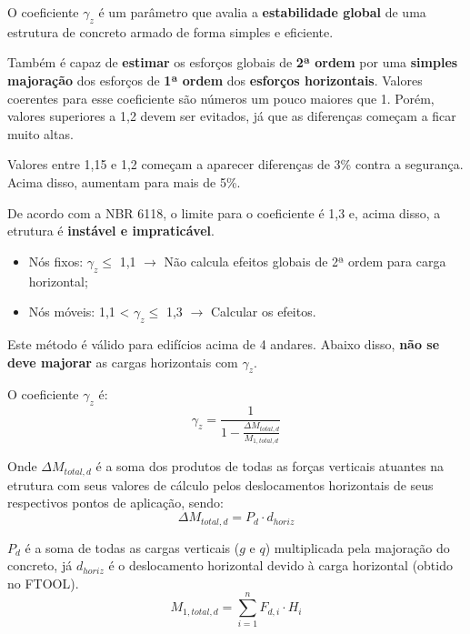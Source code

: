 O coeficiente $\gamma_z$ é um parâmetro que avalia a \textbf{estabilidade global} de uma estrutura de concreto armado de forma simples e eficiente.

Também é capaz de \textbf{estimar} os esforços globais de \textbf{2ª ordem} por uma \textbf{simples majoração} dos esforços de \textbf{1ª ordem} dos \textbf{esforços horizontais}. Valores coerentes para esse coeficiente são números um pouco maiores que 1. Porém, valores superiores a 1,2 devem ser evitados, já que as diferenças começam a ficar muito altas.

Valores entre 1,15 e 1,2 começam a aparecer diferenças de 3\% contra a segurança. Acima disso, aumentam para mais de 5\%.

De acordo com a NBR 6118, o limite para o coeficiente é 1,3 e, acima disso, a etrutura é \textbf{instável e impraticável}.

\begin{itemize}
	\item Nós fixos: $\gamma_z\leqslant$ 1,1 $\rightarrow$ Não calcula efeitos globais de 2ª ordem para carga horizontal;
	\item Nós móveis: 1,1 < $\gamma_z\leqslant$ 1,3 $\rightarrow$ Calcular os efeitos. 
\end{itemize}

Este método é válido para edifícios acima de 4 andares. Abaixo disso, \textbf{não se deve majorar} as cargas horizontais com $\gamma_z$.

O coeficiente $\gamma_z$ é:
\begin{equation}\gamma_z=\frac{1}{1-\frac{\Delta M_{total, d}}{M_{1, total, d}}}\end{equation}

Onde $\Delta M_{total, d}$ é a soma dos produtos de todas as forças verticais atuantes na etrutura com seus valores de cálculo pelos deslocamentos horizontais de seus respectivos pontos de aplicação, sendo:
\begin{equation}\Delta M_{total, d}=P_d\cdot d_{horiz}\end{equation}

$P_d$ é a soma de todas as cargas verticais ($g$ e $q$) multiplicada pela majoração do concreto, já $d_{horiz}$ é o deslocamento horizontal devido à carga horizontal (obtido no FTOOL).
\begin{equation}M_{1, total, d}=\sum_{i=1}^{n} F_{d, i}\cdot H_i\end{equation}

